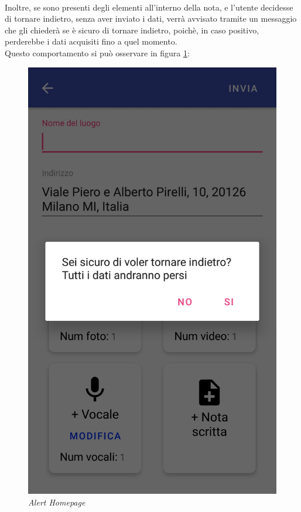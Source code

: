 \\Inoltre, se sono presenti degli elementi all'interno della nota, e l'utente decidesse di tornare indietro, senza aver inviato i dati, verrà avvisato tramite un messaggio che gli chiederà se è sicuro di tornare indietro, poichè, in caso positivo, perderebbe i dati acquisiti fino a quel momento.
\\Questo comportamento si può osservare in figura \ref{fig:alerthomepage}:
\begin{figure}[!h]
    \centering
	\includegraphics[scale=0.15]{Tesi/images/AlertHomepage}
	\caption{\textit{Alert Homepage}}
	\label{fig:alerthomepage}
\end{figure}\pagebreak

